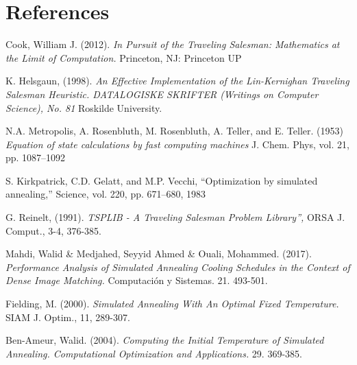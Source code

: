 \documentclass{article}
\begin{document}
\newpage
\section{References}

\begin{thebibliography}{9}

Cook, William J. (2012). \emph{In Pursuit of the Traveling Salesman: Mathematics at the Limit of Computation.} Princeton, NJ: Princeton UP

K. Helsgaun, (1998). \emph{An Effective Implementation of the Lin-Kernighan Traveling Salesman Heuristic. DATALOGISKE SKRIFTER (Writings on Computer Science), No. 81} Roskilde University.

N.A. Metropolis, A. Rosenbluth, M. Rosenbluth, A. Teller, and E. Teller. (1953) \emph{Equation of state calculations by
fast computing machines} J. Chem. Phys, vol. 21, pp. 1087–1092

S. Kirkpatrick, C.D. Gelatt, and M.P. Vecchi, “Optimization by simulated annealing,” Science, vol. 220, pp.
671–680, 1983

G. Reinelt, (1991). \emph{TSPLIB - A Traveling Salesman Problem Library”,} ORSA J. Comput., 3-4, 376-385.

Mahdi, Walid \& Medjahed, Seyyid Ahmed \& Ouali, Mohammed. (2017). \emph{Performance Analysis of Simulated Annealing Cooling Schedules in the Context of Dense Image Matching.} Computación y Sistemas. 21. 493-501.

Fielding, M. (2000). \emph{Simulated Annealing With An Optimal Fixed Temperature.} SIAM J. Optim., 11, 289-307.

Ben-Ameur, Walid. (2004). \emph{Computing the Initial Temperature of Simulated Annealing. Computational Optimization and Applications.} 29. 369-385.



\end{thebibliography}
\end{document}
